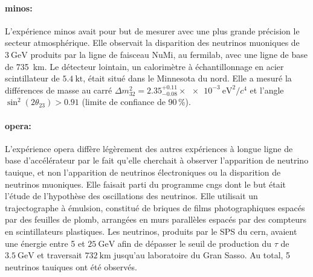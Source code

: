         \paragraph{\gls{minos}\cite{Collaboration2014}:} L'expérience \gls{minos} avait pour but de mesurer avec une plus grande précision le secteur atmosphérique. Elle observait la disparition des neutrinos muoniques de $\SI{3}{\giga\electronvolt}$ produits par la ligne de faisceau NuMi, au fermilab, avec une ligne de base de \SI{735}{\kilo\meter}. Le détecteur lointain, un calorimètre à échantillonnage en acier scintillateur de $\SI{5.4}{\kilo\tonne}$, était situé dans le Minnesota du nord. Elle a mesuré la différences de masse au carré $\Delta m_{32}^2 = 2.35^{+0.11}_{-0.08}\times\SI{e-3}{\electronvolt\squared\per c^4}$ et l'angle $\sin^2(2\theta_{23}) > 0.91$ (limite de confiance de 90\,\%). 

        \paragraph{\gls{opera}\cite{Agafonova2018}:} L'expérience \gls{opera} diffère légèrement des autres expériences à longue ligne de base d'accélérateur par le fait qu'elle cherchait à observer l'apparition de neutrino tauique, et non l'apparition de neutrinos électroniques ou la disparition de neutrinos muoniques. Elle faisait parti du programme \gls{cngs} dont le but était l'étude de l'hypothèse des oscillations des neutrinos. Elle utilisait un trajectographe à émulsion, constitué de  briques de films photographiques espacés par des feuilles de plomb, arrangées en murs parallèles espacés par des compteurs en scintillateurs plastiques. Les neutrinos, produits par le SPS du \gls{cern}, avaient une énergie entre 5 et $\SI{25}{\giga\electronvolt}$ afin de dépasser le seuil de production du $\tau$ de $\SI{3.5}{\giga\electronvolt}$ et traversait $\SI{732}{\kilo\meter}$ jusqu'au laboratoire du Gran Sasso. Au total, 5 neutrinos tauiques ont été observés.
        
